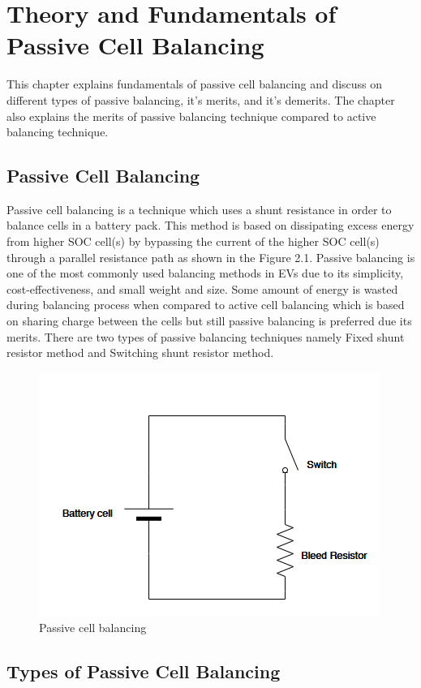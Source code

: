 \chapter{Theory and Fundamentals of Passive Cell Balancing}
This chapter explains fundamentals of passive cell balancing and discuss on different types of passive balancing, it's merits, and it's demerits. The chapter also explains the merits of passive balancing technique compared to active balancing technique.


\section{Passive Cell Balancing}
Passive cell balancing is a technique which uses a shunt resistance in order to balance cells in a battery pack. This method is based on dissipating excess energy from higher SOC cell(s) by bypassing the current of the higher SOC cell(s) through a parallel resistance path as shown in the Figure 2.1. Passive balancing is one of the most commonly used balancing methods in EVs due to its simplicity, cost-effectiveness, and small weight and size. Some amount of energy is wasted during balancing process when compared to active cell balancing which is based on sharing charge between the cells but still passive balancing is preferred due its merits. There are two types of passive balancing techniques namely Fixed shunt resistor method and Switching shunt resistor method.

\begin{figure}[h!]
    \centering
    \includegraphics[]{Chapter2/Figures/passivebal.PNG}
    \caption{Passive cell balancing}
\end{figure}

\section{Types of Passive Cell Balancing}
